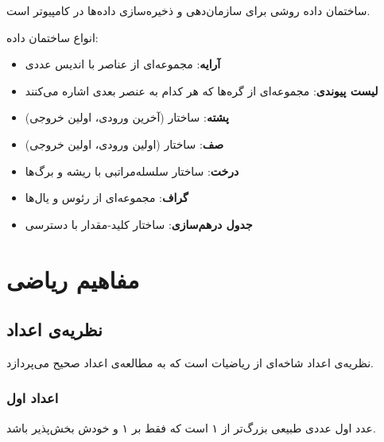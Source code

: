 \documentclass{matinbook}
\begin{document}
ساختمان داده روشی برای
سازمان‌دهی و ذخیره‌سازی داده‌ها در کامپیوتر است.

انواع ساختمان داده:

\begin{itemize}
    \item \textbf{آرایه}: مجموعه‌ای از
    عناصر با اندیس عددی
    \item \textbf{لیست پیوندی}:
    مجموعه‌ای از گره‌ها که هر کدام به عنصر
    بعدی اشاره می‌کنند
    \item \textbf{پشته}: ساختار
     (آخرین ورودی، اولین خروجی)
    \item \textbf{صف}: ساختار
     (اولین ورودی، اولین خروجی)
    \item \textbf{درخت}: ساختار
    سلسله‌مراتبی با
    ریشه و برگ‌ها
    \item \textbf{گراف}: مجموعه‌ای از
    رئوس و یال‌ها
    \item \textbf{جدول درهم‌سازی}:
    ساختار کلید-مقدار با دسترسی
\end{itemize}

\chapter{مفاهیم ریاضی}
\label{chap:mathematics}

\section{نظریه‌ی اعداد}
\label{sec:math-numbertheory}

نظریه‌ی اعداد شاخه‌ای از
ریاضیات است که به مطالعه‌ی اعداد
صحیح می‌پردازد.

\subsection{اعداد اول}
\label{sec:math-primes}

عدد اول عددی طبیعی بزرگ‌تر از ۱ است
که فقط بر ۱ و خودش بخش‌پذیر باشد.
\end{document}
